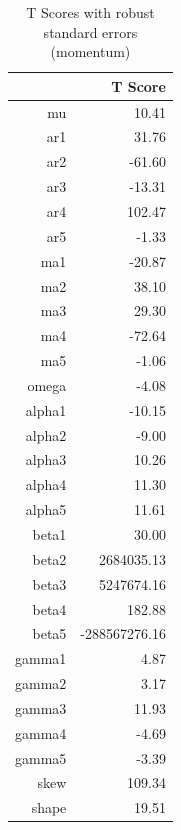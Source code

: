 \documentclass[12pt,letterpaper]{memoir}
\begin{document}
\begin{table}[ht]
\centering
\caption{T Scores with robust standard errors (momentum)}
\begin{tabular}{rr}
  \hline
 & T Score \\ 
  \hline
mu & 10.41 \\ 
  ar1 & 31.76 \\ 
  ar2 & -61.60 \\ 
  ar3 & -13.31 \\ 
  ar4 & 102.47 \\ 
  ar5 & -1.33 \\ 
  ma1 & -20.87 \\ 
  ma2 & 38.10 \\ 
  ma3 & 29.30 \\ 
  ma4 & -72.64 \\ 
  ma5 & -1.06 \\ 
  omega & -4.08 \\ 
  alpha1 & -10.15 \\ 
  alpha2 & -9.00 \\ 
  alpha3 & 10.26 \\ 
  alpha4 & 11.30 \\ 
  alpha5 & 11.61 \\ 
  beta1 & 30.00 \\ 
  beta2 & 2684035.13 \\ 
  beta3 & 5247674.16 \\ 
  beta4 & 182.88 \\ 
  beta5 & -288567276.16 \\ 
  gamma1 & 4.87 \\ 
  gamma2 & 3.17 \\ 
  gamma3 & 11.93 \\ 
  gamma4 & -4.69 \\ 
  gamma5 & -3.39 \\ 
  skew & 109.34 \\ 
  shape & 19.51 \\ 
   \hline
\end{tabular}
\end{table}
\end{document}
